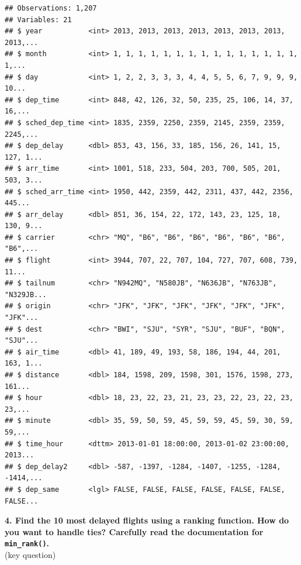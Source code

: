 \documentclass[]{book}
\newenvironment{Shaded}{\begin{snugshade}}{\end{snugshade}}
\newcommand{\DataTypeTok}[1]{\textcolor[rgb]{0.13,0.29,0.53}{#1}}
\newcommand{\DecValTok}[1]{\textcolor[rgb]{0.00,0.00,0.81}{#1}}
\newcommand{\KeywordTok}[1]{\textcolor[rgb]{0.13,0.29,0.53}{\textbf{#1}}}
\newcommand{\NormalTok}[1]{#1}
\newcommand{\OperatorTok}[1]{\textcolor[rgb]{0.81,0.36,0.00}{\textbf{#1}}}
\newcommand{\StringTok}[1]{\textcolor[rgb]{0.31,0.60,0.02}{#1}}
\theoremstyle{definition}
\theoremstyle{definition}
\theoremstyle{definition}
\theoremstyle{remark}
\begin{document}
\begin{verbatim}
## Observations: 1,207
## Variables: 21
## $ year           <int> 2013, 2013, 2013, 2013, 2013, 2013, 2013, 2013,...
## $ month          <int> 1, 1, 1, 1, 1, 1, 1, 1, 1, 1, 1, 1, 1, 1, 1, 1,...
## $ day            <int> 1, 2, 2, 3, 3, 3, 4, 4, 5, 5, 6, 7, 9, 9, 9, 10...
## $ dep_time       <int> 848, 42, 126, 32, 50, 235, 25, 106, 14, 37, 16,...
## $ sched_dep_time <int> 1835, 2359, 2250, 2359, 2145, 2359, 2359, 2245,...
## $ dep_delay      <dbl> 853, 43, 156, 33, 185, 156, 26, 141, 15, 127, 1...
## $ arr_time       <int> 1001, 518, 233, 504, 203, 700, 505, 201, 503, 3...
## $ sched_arr_time <int> 1950, 442, 2359, 442, 2311, 437, 442, 2356, 445...
## $ arr_delay      <dbl> 851, 36, 154, 22, 172, 143, 23, 125, 18, 130, 9...
## $ carrier        <chr> "MQ", "B6", "B6", "B6", "B6", "B6", "B6", "B6",...
## $ flight         <int> 3944, 707, 22, 707, 104, 727, 707, 608, 739, 11...
## $ tailnum        <chr> "N942MQ", "N580JB", "N636JB", "N763JB", "N329JB...
## $ origin         <chr> "JFK", "JFK", "JFK", "JFK", "JFK", "JFK", "JFK"...
## $ dest           <chr> "BWI", "SJU", "SYR", "SJU", "BUF", "BQN", "SJU"...
## $ air_time       <dbl> 41, 189, 49, 193, 58, 186, 194, 44, 201, 163, 1...
## $ distance       <dbl> 184, 1598, 209, 1598, 301, 1576, 1598, 273, 161...
## $ hour           <dbl> 18, 23, 22, 23, 21, 23, 23, 22, 23, 22, 23, 23,...
## $ minute         <dbl> 35, 59, 50, 59, 45, 59, 59, 45, 59, 30, 59, 59,...
## $ time_hour      <dttm> 2013-01-01 18:00:00, 2013-01-02 23:00:00, 2013...
## $ dep_delay2     <dbl> -587, -1397, -1284, -1407, -1255, -1284, -1414,...
## $ dep_same       <lgl> FALSE, FALSE, FALSE, FALSE, FALSE, FALSE, FALSE...
\end{verbatim}

\textbf{4. Find the 10 most delayed flights using a ranking function.
How do you want to handle ties? Carefully read the documentation for
\texttt{min\_rank()}.}\\
(key question)

\begin{Shaded}
\end{Shaded}
\end{document}
